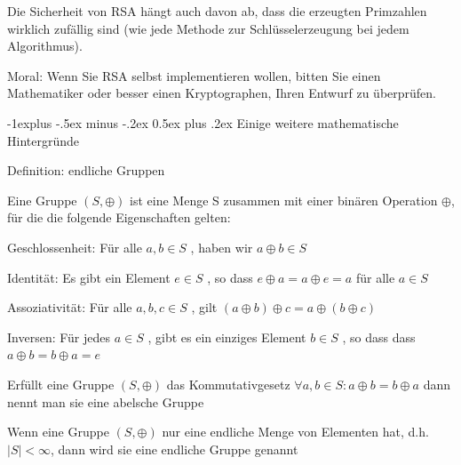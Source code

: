 \documentclass[a4paper]{article}
\makeatletter
\renewcommand{\subsection}{\@startsection{subsection}{2}{0mm}%
 {-1explus -.5ex minus -.2ex}%
 {0.5ex plus .2ex}%
 {\normalfont\normalsize\bfseries}}
\makeatother
\begin{document}
\begin{multicols}{3}
\begin{itemize*}
\begin{itemize*}
\begin{itemize*}
                  \end{itemize*}
                  \item Die Sicherheit von RSA hängt auch davon ab, dass die erzeugten Primzahlen wirklich zufällig sind (wie jede Methode zur Schlüsselerzeugung bei jedem Algorithmus).
                  \item Moral: Wenn Sie RSA selbst implementieren wollen, bitten Sie einen Mathematiker oder besser einen Kryptographen, Ihren Entwurf zu überprüfen.
            \end{itemize*}
      \end{itemize*}

      \subsection{Einige weitere mathematische Hintergründe}
      \begin{itemize*}
            \item Definition: endliche Gruppen
            \begin{itemize*}
                  \item Eine Gruppe $( S , \oplus)$ ist eine Menge S zusammen mit einer binären Operation $\oplus$, für die die folgende Eigenschaften gelten:
                  \begin{itemize*}
                        \item Geschlossenheit: Für alle $a, b \in S$ , haben wir $a \oplus b \in S$
                        \item Identität: Es gibt ein Element $e \in S$ , so dass $e \oplus a = a \oplus e = a$ für alle $a \in S$
                        \item Assoziativität: Für alle $a, b, c \in S$ , gilt $( a \oplus b ) \oplus c = a \oplus ( b \oplus c )$
                        \item Inversen: Für jedes $a \in S$ , gibt es ein einziges Element $b \in S$ , so dass dass $a \oplus b = b \oplus a = e$
                  \end{itemize*}
                  \item Erfüllt eine Gruppe $( S , \oplus)$ das Kommutativgesetz $\forall a, b \in S : a \oplus b = b \oplus a$ dann nennt man sie eine abelsche Gruppe
                  \item Wenn eine Gruppe $( S , \oplus)$ nur eine endliche Menge von Elementen hat, d.h. $|S| < \infty$, dann wird sie eine endliche Gruppe genannt
            \end{itemize*}

\end{itemize*}
\end{multicols}
\end{document}
